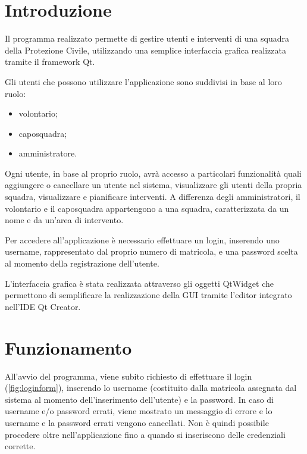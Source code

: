 \section{Introduzione}
Il programma realizzato permette di gestire utenti e interventi di una squadra della Protezione Civile, utilizzando una semplice interfaccia grafica realizzata tramite il framework Qt.

Gli utenti che possono utilizzare l'applicazione sono suddivisi in base al loro ruolo:
\begin{itemize}
	\item volontario;
	\item caposquadra;
	\item amministratore.
\end{itemize}
Ogni utente, in base al proprio ruolo, avrà accesso a particolari funzionalità quali aggiungere o cancellare un utente nel sistema, visualizzare gli utenti della propria squadra, visualizzare e pianificare interventi. A differenza degli amministratori, il volontario e il caposquadra appartengono a una squadra, caratterizzata da un nome e da un'area di intervento. 

Per accedere all'applicazione è necessario effettuare un login, inserendo uno username, rappresentato dal proprio numero di matricola, e una password scelta al momento della registrazione dell'utente.

L'interfaccia grafica è stata realizzata attraverso gli oggetti QtWidget che permettono di semplificare la realizzazione della GUI tramite l'editor integrato nell'IDE Qt Creator.

\section{Funzionamento}
All'avvio del programma, viene subito richiesto di effettuare il login (\Fig\ref{fig:loginform}), inserendo lo username (costituito dalla matricola assegnata dal sistema al momento dell'inserimento dell'utente) e la password. In caso di username e/o password errati, viene mostrato un messaggio di errore e lo username e la password errati vengono cancellati. Non è quindi possibile procedere oltre nell'applicazione fino a quando si inseriscono delle credenziali corrette.

